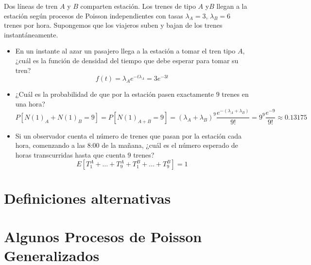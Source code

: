 \documentclass[PREyA.tex]{subfiles}
\begin{document}
\begin{example}
Dos líneas de tren $A$ y $B$ comparten estación. Los trenes de tipo $A$ y$B$ llegan a la estación según procesos de Poisson independientes con tasas $\lambda_A =3$, $\lambda_B =6$ trenes por hora. Supongemos que los viajeros suben y bajan de los trenes instantáneamente.
\begin{itemize}
\item En un instante al azar un pasajero llega a la estación a tomar el tren tipo $A$, ¿cuál es la función de densidad del tiempo que debe esperar para tomar su tren?
$$
f(t) = \lambda_A e^{-t\lambda_A} = 3e^{-3t}
$$
\item ¿Cuál es la probabilidad de que por la estación pasen exactamente $9$ trenes en una hora?
$$
P[N(1)_A + N(1)_B = 9] = P[N(1)_{A+B} = 9] = (\lambda_A + \lambda_B)^9\frac{e^{-(\lambda_A+\lambda_B)}}{9!} = 9^9\frac{e^{-9}}{9!} \approx 0.13175
$$
\item Si un observador cuenta el número de trenes que pasan por la estación cada hora, comenzando a las 8:00 de la mañana, ¿cuál es el número esperado de horas transcurridas hasta que cuenta $9$ trenes?
$$
E[T_1^A + \dotsc + T_9^A + T_1^B + \dotsc + T_9^B] = 
1$$
\end{itemize}
\end{example}
\section{Definiciones alternativas}
\section{Algunos Procesos de Poisson Generalizados}
\end{document}
